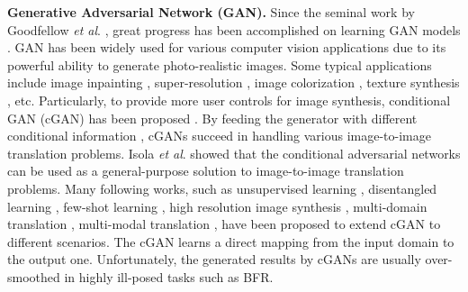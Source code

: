 \documentclass[final]{cvpr}
\begin{document}
\textbf{Generative Adversarial Network (GAN).}
Since the seminal work by Goodfellow \emph{et al}. \cite{Goodfellow2014GAN}, great progress has been accomplished on learning GAN models \cite{Karras2018PGGAN,Brock2019BigGAN,Karras2018StyleGAN,Karras2019StyleGAN2}. GAN has been widely used for various computer vision applications due to its powerful ability to generate photo-realistic images. Some typical applications include image inpainting \cite{Yu2018Deepfill}, super-resolution \cite{Ledig2017SRGAN,Wang2018ESRGAN}, image colorization \cite{Isola2017Pix2Pix,Suarez2017Color}, texture synthesis \cite{Slossberg2018Texture}, etc. Particularly, to provide more user controls for image synthesis, conditional GAN (cGAN) has been proposed \cite{Mirza2014cGAN}. By feeding the generator with different conditional information \cite{Park2019SPADE,Isola2017Pix2Pix,Zhu2017CycleGAN}, cGANs succeed in handling various image-to-image translation problems. Isola \emph{et al}. \cite{Isola2017Pix2Pix} showed that the conditional adversarial networks can be used as a general-purpose solution to image-to-image translation problems. Many following works, such as unsupervised learning \cite{Zhu2017CycleGAN}, disentangled learning \cite{Lee2018DRIT}, few-shot learning \cite{Liu2019Few}, high resolution image synthesis \cite{Wang2018Pix2PixHD}, multi-domain translation \cite{Choi2018Stargan}, multi-modal translation \cite{Zhu2017Multimodal}, have been proposed to extend cGAN to different scenarios. The cGAN learns a direct mapping from the input domain to the output one. Unfortunately, the generated results by cGANs are usually over-smoothed in highly ill-posed tasks such as BFR.
\end{document}
